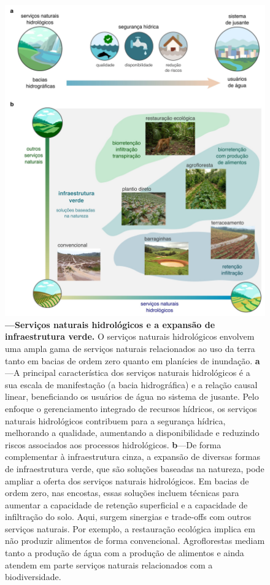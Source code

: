 \documentclass[./main.tex]{subfiles}
\begin{document}
\begin{figure}[t!] 
\centering				
\includegraphics[width=0.98\linewidth]{figs/fig_sbn.jpg}		
\caption[Serviços naturais hidrológicos e a expansão de infraestrutura verde.]
{\textbf{---\;Serviços naturais hidrológicos e a expansão de infraestrutura verde.}
    O serviços naturais hidrológicos envolvem uma ampla gama de serviços naturais relacionados ao uso da terra tanto em bacias de ordem zero quanto em planícies de inundação.
    \;\textbf{a}\;---\;A principal característica dos serviços naturais hidrológicos é a sua escala de manifestação (a bacia hidrográfica) e a relação causal linear, beneficiando os usuários de água no sistema de jusante. Pelo enfoque o gerenciamento integrado de recursos hídricos, os serviços naturais hidrológicos contribuem para a segurança hídrica, melhorando a qualidade, aumentando a disponibilidade e reduzindo riscos associados aos processos hidrológicos.
    \;\textbf{b}\;---\;De forma complementar à infraestrutura cinza, a expansão de diversas formas de infraestrutura verde, que são soluções baseadas na natureza, pode ampliar a oferta dos serviços naturais hidrológicos. Em bacias de ordem zero, nas encostas, essas soluções incluem técnicas para aumentar a capacidade de retenção superficial e a capacidade de infiltração do solo. Aqui, surgem sinergias e trade-offs com outros serviços naturais. Por exemplo, a restauração ecológica implica em não produzir alimentos de forma convencional. Agroflorestas mediam tanto a produção de água com a produção de alimentos e ainda atendem em parte serviços naturais relacionados com a biodiversidade. 
}
\label{fig:eco:watersheds} 		
\end{figure}
\end{document}
